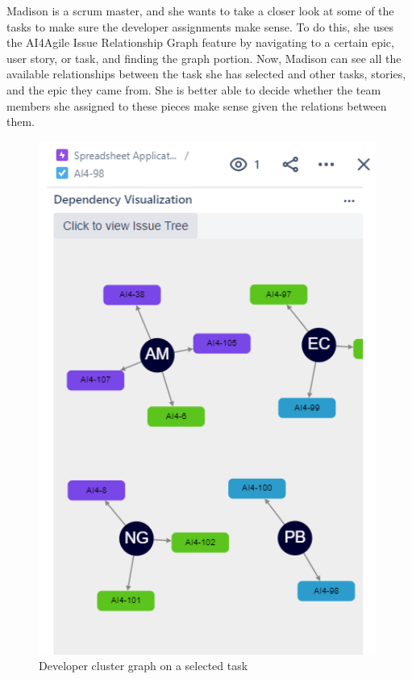 Madison is a scrum master, and she wants to take a closer look at some of the tasks to make sure the developer assignments make sense. To do this, she uses the AI4Agile Issue Relationship Graph feature by navigating to a certain epic, user story, or task, and finding the graph portion. Now, Madison can see all the available relationships between the task she has selected and other tasks, stories, and the epic they came from. She is better able to decide whether the team members she assigned to these pieces make sense given the relations between them.

\begin{figure}
\centerline{\includegraphics[width=\textwidth,height=\textheight,keepaspectratio]{./figure/Scenario2Figure2.png}}
\caption{Developer cluster graph on a selected task}
\end{figure}

\subsection{}